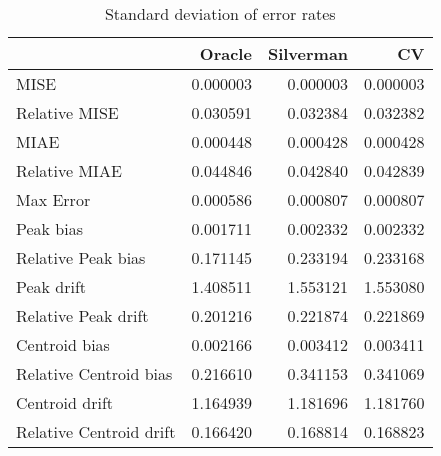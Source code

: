 \begin{table}[H]
\centering
\begin{tabular}{lrrr}
  \hline
 & Oracle & Silverman & CV \\ 
  \hline
MISE & 0.000003 & 0.000003 & 0.000003 \\ 
  Relative MISE & 0.030591 & 0.032384 & 0.032382 \\ 
  MIAE & 0.000448 & 0.000428 & 0.000428 \\ 
  Relative MIAE & 0.044846 & 0.042840 & 0.042839 \\ 
  Max Error & 0.000586 & 0.000807 & 0.000807 \\ 
  Peak bias & 0.001711 & 0.002332 & 0.002332 \\ 
  Relative Peak bias & 0.171145 & 0.233194 & 0.233168 \\ 
  Peak drift & 1.408511 & 1.553121 & 1.553080 \\ 
  Relative Peak drift & 0.201216 & 0.221874 & 0.221869 \\ 
  Centroid bias & 0.002166 & 0.003412 & 0.003411 \\ 
  Relative Centroid bias & 0.216610 & 0.341153 & 0.341069 \\ 
  Centroid drift & 1.164939 & 1.181696 & 1.181760 \\ 
  Relative Centroid drift & 0.166420 & 0.168814 & 0.168823 \\ 
   \hline
\end{tabular}
\caption{Standard deviation of error rates} 
\label{tbl:stddev_error_rates}
\end{table}

